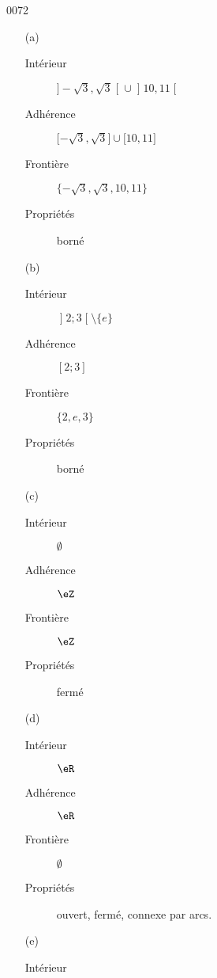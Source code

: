 \begin{corrige}{0072}
    \begin{enumerate}
        \item[(a)]
            \begin{description}
                \item[Intérieur] 
     $]-\sqrt3,\sqrt3\mathclose[\cup\mathopen]10,11\mathclose[$
     \item[Adhérence]
    $\mathopen[-\sqrt3,\sqrt3\mathclose]\cup\mathopen[10,11\mathclose]$ 
\item[Frontière]
    $\{-\sqrt3,\sqrt3,10,11\}$
\item[Propriétés] borné
            \end{description}
        \item[(b)] 
            \begin{description}
                \item[Intérieur]
 $\mathopen]2;3\mathclose[\setminus\{e\}$
                \item[Adhérence]
      $[2;3]$ 
                \item[Frontière]
 $\{2, e, 3\}$ 
                \item[Propriétés]
                    borné
            \end{description}
        \item[(c)] 
            \begin{description}
                \item[Intérieur]
     $\emptyset$
                \item[Adhérence]
  $\eZ$ 
                \item[Frontière]
 $\eZ$
                \item[Propriétés]
  fermé
            \end{description}
        \item[(d)] 
            \begin{description}
                \item[Intérieur]
                    \( \eR\)
                \item[Adhérence]
                    \( \eR\)
                \item[Frontière]
     $\emptyset$
                \item[Propriétés]
                    ouvert, fermé, connexe par arcs.
            \end{description}
        \item[(e)] 
            \begin{description}
                \item[Intérieur]

\end{description}
\end{enumerate}
\end{corrige}
